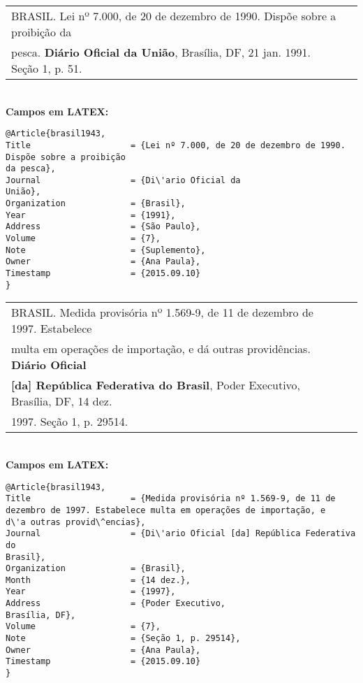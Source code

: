 \begin{tabular}{|l|c|} \hline
	BRASIL. Lei nº 7.000, de 20 de dezembro de 1990. Dispõe sobre a proibição
	da \\ pesca. \textbf{Di\'ario Oficial da União}, Brasília, DF, 21 jan. 1991. Seção 1, p. 51.
	\\\hline
\end{tabular} \\

\textbf{Campos em LATEX:} 

\begin{verbatim}
@Article{brasil1943,
Title                    = {Lei nº 7.000, de 20 de dezembro de 1990. 
Dispõe sobre a proibição
da pesca},
Journal                  = {Di\'ario Oficial da
União},
Organization             = {Brasil},
Year                     = {1991},
Address                  = {São Paulo},
Volume                   = {7},
Note                     = {Suplemento},
Owner                    = {Ana Paula},
Timestamp                = {2015.09.10}
}
\end{verbatim}

\begin{tabular}{|l|c|} \hline
	BRASIL. Medida provisória nº 1.569-9, de 11 de dezembro de 1997.
	Estabelece \\ multa em operações de importação, e d\'a outras provid\^encias.
	\textbf{Di\'ario Oficial} \\ \textbf{[da] República Federativa do Brasil}, Poder Executivo,
	Brasília, DF, 14 dez.\\
	1997. Seção 1, p. 29514. \\\hline
\end{tabular} \\

\textbf{Campos em LATEX:} 

\begin{verbatim}
@Article{brasil1943,
Title                    = {Medida provisória nº 1.569-9, de 11 de 
dezembro de 1997. Estabelece multa em operações de importação, e 
d\'a outras provid\^encias},
Journal                  = {Di\'ario Oficial [da] República Federativa do 
Brasil},
Organization             = {Brasil},
Month                    = {14 dez.},
Year                     = {1997},
Address                  = {Poder Executivo,
Brasília, DF},
Volume                   = {7},
Note                     = {Seção 1, p. 29514},
Owner                    = {Ana Paula},
Timestamp                = {2015.09.10}
}
\end{verbatim}


